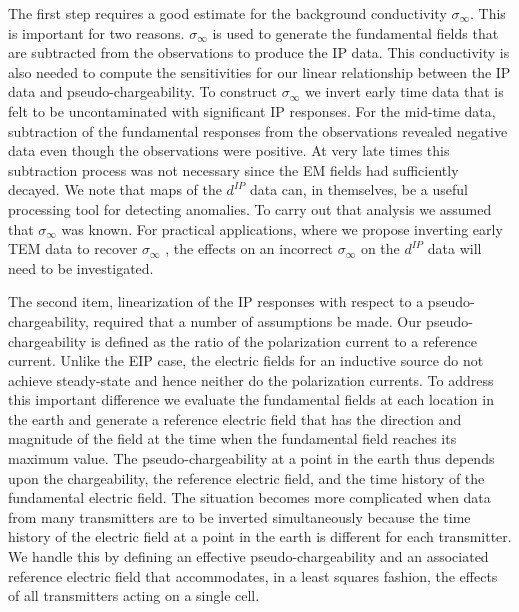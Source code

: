 \documentclass[extra,mreferee]{gji}
\newcommand{\siginf}{\sigma_\infty}
\begin{document}
The first step requires a good estimate for the background conductivity $\siginf$. This is important for two reasons. $\siginf$ is used to generate the fundamental fields that are subtracted from the observations to produce the IP data. This conductivity is also needed to compute the sensitivities for our linear relationship between the IP data and pseudo-chargeability.
To construct $\siginf$ we invert early time data that is felt to be uncontaminated with significant IP responses.  For the mid-time data, subtraction of the fundamental responses from the observations revealed negative data even though the observations were positive. At very late times this subtraction process was not necessary since the EM fields had sufficiently decayed.
We note that maps of the $d^{IP}$ data can, in themselves, be a useful processing tool for detecting anomalies. To carry out that analysis  we assumed that $\siginf$ was known. For practical applications, where we propose  inverting early TEM data to recover $\siginf$ , the effects on an incorrect $\siginf$ on the $d^{IP}$ data will need to be investigated.




The second item, linearization of the IP responses with respect to a pseudo-chargeability, required that a number of assumptions be made. Our pseudo-chargeability is defined as the ratio of the polarization current to a reference current. Unlike the EIP case, the electric fields for an inductive source do not achieve steady-state and hence neither do the polarization currents. To address this important difference we evaluate the fundamental fields at each location in the earth and generate a reference electric field that has the direction and magnitude of the field at the time when the fundamental field  reaches its maximum value. The pseudo-chargeability at a point in the earth thus depends upon the chargeability, the reference electric field, and the time history of the fundamental electric field. The situation becomes more complicated when data from many transmitters are to be inverted simultaneously because the time history of the electric field at a point in the earth is different for each transmitter. We handle this by defining an effective pseudo-chargeability and an associated reference electric field that accommodates, in a least squares fashion, the effects of all transmitters acting on a single cell.
\end{document}
